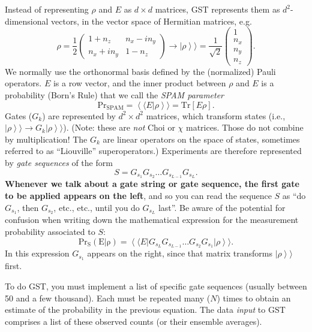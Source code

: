 \documentclass{article}[11pt]
\newcommand{\rrangle}{\rangle\!\rangle} \newcommand{\llangle}{\langle\!\langle}
\newcommand{\sket}[1]{\ensuremath{\left|#1\right\rrangle}}
\newcommand{\sbra}[1]{\ensuremath{\left\llangle#1\right|}}
\newcommand{\sbraket}[2]{\ensuremath{\left\llangle#1|#2\right\rrangle}}
\newcommand{\sbraopket}[3]{\ensuremath{\sbra{#1}#2\sket{#3}}}
\newcommand{\Tr}{\mathrm{Tr}}
\begin{document}
Instead of representing $\rho$ and $E$ as $d\times d$ matrices, GST represents them as $d^2$-dimensional vectors, in the vector space of Hermitian matrices, e.g.
\begin{equation}
\rho = \frac{1}{2} \left(\begin{array}{cc}1+n_z&n_x-in_y\\ n_x+in_y&1-n_z\end{array}\right) \longrightarrow \sket{\rho} = \frac{1}{\sqrt{2}}\left(\begin{array}{c}1\\ n_x \\ n_y\\ n_z\end{array}\right).
\end{equation}
We normally use the orthonormal basis defined by the (normalized) Pauli operators.  $E$ is a row vector, and the inner product between $\rho$ and $E$ is a probability (Born's Rule) that we call the \emph{SPAM parameter}
\begin{equation}
\mathrm{Pr_{SPAM}} = \sbraket{E}{\rho} = \Tr[E\rho].
\end{equation}
Gates ($G_k$) are represented by $d^2\times d^2$ matrices, which transform states (i.e., $\sket{\rho} \to G_k\sket{\rho}$).  (Note: these are \emph{not} Choi or $\chi$ matrices.  Those do not combine by multiplication!  The $G_k$ are linear operators on the space of states, sometimes referred to as ``Liouville'' superoperators.) Experiments are therefore represented by \emph{gate sequences} of the form
\begin{equation*}
S = G_{s_1}G_{s_2}\ldots G_{s_{L-1}}G_{s_L}.  
\end{equation*}
\textbf{Whenever we talk about a gate string or gate sequence, the first gate to be applied appears on the left}, and so you can read the sequence $S$ as ``do $G_{s_1}$, then $G_{s_2}$, etc., etc., until you do $G_{s_L}$ last''.  Be aware of the potential for confusion when writing down the mathematical expression for the measurement probability associated to $S$:
\begin{equation}
\mathrm{Pr_S(E|\rho)} = \sbraopket{E}{G_{s_L}G_{s_{L-1}}\ldots G_{s_2}G_{s_1}}{\rho}.
\end{equation}
In this expression $G_{s_1}$ appears on the right, since that matrix transforms $\sket{\rho}$ first.

To do GST, you must implement a list of specific gate sequences (usually between 50 and a few thousand).  Each must be repeated many ($N$) times to obtain an estimate of the probability in the previous equation.  The data \emph{input} to GST comprises a list of these observed counts (or their ensemble averages).
\end{document}
